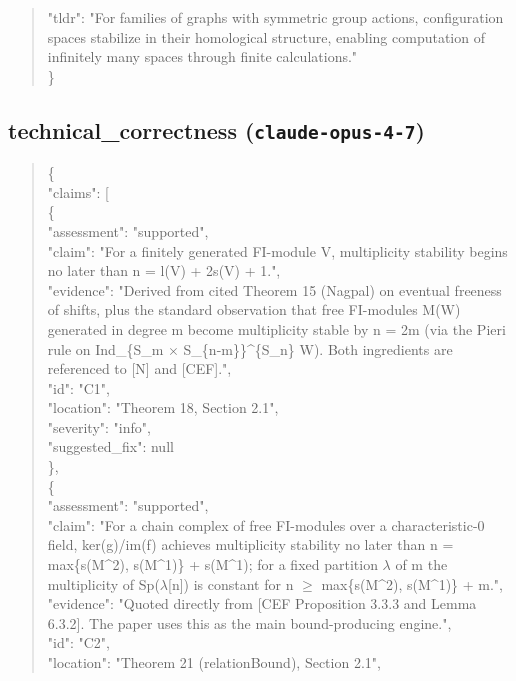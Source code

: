 \documentclass[11pt]{article}
\begin{document}
\begin{quote}
  "tldr": "For families of graphs with symmetric group actions, configuration spaces stabilize in their homological structure, enabling computation of infinitely many spaces through finite calculations."\\
\}\\
\end{quote}

\subsection*{technical\_correctness (\texttt{claude-opus-4-7})}
\begin{quote}\small\ttfamily\raggedright
\{\\
  "claims": [\\
    \{\\
      "assessment": "supported",\\
      "claim": "For a finitely generated FI-module V, multiplicity stability begins no later than n = l(V) + 2s(V) + 1.",\\
      "evidence": "Derived from cited Theorem 15 (Nagpal) on eventual freeness of shifts, plus the standard observation that free FI-modules M(W) generated in degree m become multiplicity stable by n = 2m (via the Pieri rule on Ind\_\{S\_m \ensuremath{\times} S\_\{n-m\}\}\^{}\{S\_n\} W). Both ingredients are referenced to [N] and [CEF].",\\
      "id": "C1",\\
      "location": "Theorem 18, Section 2.1",\\
      "severity": "info",\\
      "suggested\_fix": null\\
    \},\\
    \{\\
      "assessment": "supported",\\
      "claim": "For a chain complex of free FI-modules over a characteristic-0 field, ker(g)/im(f) achieves multiplicity stability no later than n = max\{s(M\^{}2), s(M\^{}1)\} + s(M\^{}1); for a fixed partition \ensuremath{\lambda} of m the multiplicity of Sp(\ensuremath{\lambda}[n]) is constant for n \ensuremath{\ge} max\{s(M\^{}2), s(M\^{}1)\} + m.",\\
      "evidence": "Quoted directly from [CEF Proposition 3.3.3 and Lemma 6.3.2]. The paper uses this as the main bound-producing engine.",\\
      "id": "C2",\\
      "location": "Theorem 21 (relationBound), Section 2.1",\\

\end{quote}
\end{document}

